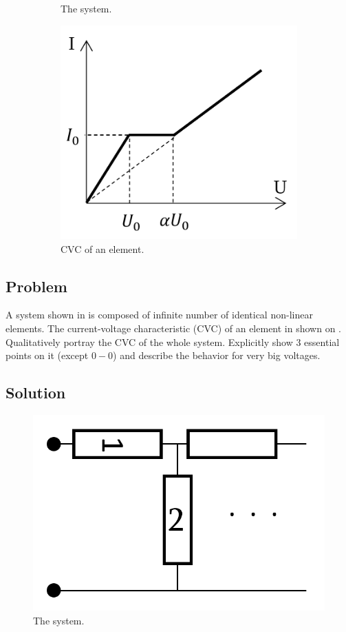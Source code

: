 \begin{figure}
\begin{subfigure}[l]{.143\textwidth}
        \caption{The system.}
    \end{subfigure}
    \hfill
    \begin{subfigure}[l]{.3\textwidth}
        \centering
        \includegraphics[width = \textwidth]{P-2}
        \caption{CVC of an element.}
    \end{subfigure}
    
    \caption{}
    \vspace{-1cm}
\end{figure}
\subsection*{Problem}

A system shown in 
is composed of infinite number of identical non-linear elements.
The current-voltage characteristic (CVC) of an element in shown on . 
Qualitatively portray the CVC of the whole system.
Explicitly show 3 essential points on it (except $0-0$) and
describe the behavior for very big voltages.

\vspace{2cm}

\subsection*{Solution}

\begin{figure}
    \vspace{-.75cm}
    \centering
    \includegraphics[width = .25\textwidth]{S-1}
    \caption{The system.}
    \vspace{-.5cm}
\end{figure}

